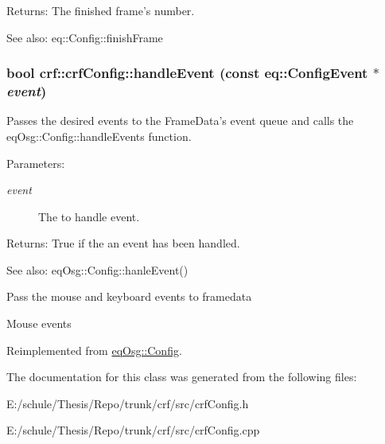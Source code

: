 \begin{Desc}
\item[Returns:]The finished frame's number. \end{Desc}
\begin{Desc}
\item[See also:]eq::Config::finishFrame \end{Desc}
\hypertarget{a00004_63938a0cf75d236b677c4cb147933b3c}{
\subsubsection[{handleEvent}]{\setlength{\rightskip}{0pt plus 5cm}bool crf::crfConfig::handleEvent (const eq::ConfigEvent $\ast$ {\em event})}}
\label{a00004_63938a0cf75d236b677c4cb147933b3c}


Passes the desired events to the FrameData's event queue and calls the eqOsg::Config::handleEvents function. 

\begin{Desc}
\item[Parameters:]
\begin{description}
\item[{\em event}]The to handle event. \end{description}
\end{Desc}
\begin{Desc}
\item[Returns:]True if the an event has been handled. \end{Desc}
\begin{Desc}
\item[See also:]eqOsg::Config::hanleEvent() \end{Desc}


Pass the mouse and keyboard events to framedata

Mouse events 

Reimplemented from \hyperlink{a00003_0ac41bd28010ff7f7638beb051b6c9b9}{eqOsg::Config}.

The documentation for this class was generated from the following files:\begin{CompactItemize}
\item 
E:/schule/Thesis/Repo/trunk/crf/src/crfConfig.h\item 
E:/schule/Thesis/Repo/trunk/crf/src/crfConfig.cpp\end{CompactItemize}
